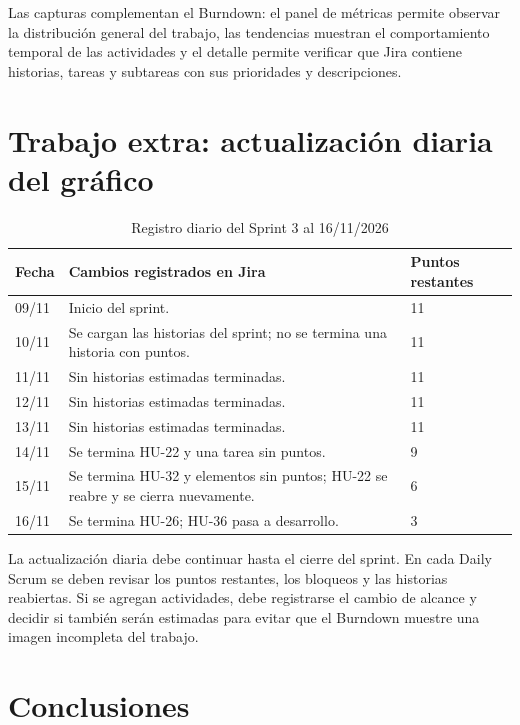 \documentclass[12pt,a4paper]{article}
\begin{document}
\noindent
Las capturas complementan el Burndown: el panel de métricas permite observar
la distribución general del trabajo, las tendencias muestran el comportamiento
temporal de las actividades y el detalle permite verificar que Jira contiene
historias, tareas y subtareas con sus prioridades y descripciones.

\section{Trabajo extra: actualización diaria del gráfico}

\begin{table}[h]
\centering
\caption{Registro diario del Sprint 3 al 16/11/2026}
\label{tab:registroDiario}
\begin{tabular}{p{2cm}p{8cm}p{3cm}}
\toprule
\textbf{Fecha} & \textbf{Cambios registrados en Jira} & \textbf{Puntos restantes}\\
\midrule
09/11 & Inicio del sprint. & 11\\
10/11 & Se cargan las historias del sprint; no se termina una historia con
puntos. & 11\\
11/11 & Sin historias estimadas terminadas. & 11\\
12/11 & Sin historias estimadas terminadas. & 11\\
13/11 & Sin historias estimadas terminadas. & 11\\
14/11 & Se termina HU-22 y una tarea sin puntos. & 9\\
15/11 & Se termina HU-32 y elementos sin puntos; HU-22 se reabre y se cierra
nuevamente. & 6\\
16/11 & Se termina HU-26; HU-36 pasa a desarrollo. & 3\\
\bottomrule
\end{tabular}
\end{table}

La actualización diaria debe continuar hasta el cierre del sprint. En cada
Daily Scrum se deben revisar los puntos restantes, los bloqueos y las
historias reabiertas. Si se agregan actividades, debe registrarse el cambio de
alcance y decidir si también serán estimadas para evitar que el Burndown
muestre una imagen incompleta del trabajo.

\section{Conclusiones}
\end{document}

